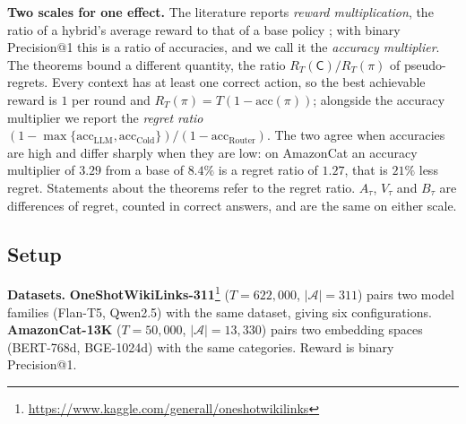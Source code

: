 \documentclass{article}
\theoremstyle{definition}
\theoremstyle{remark}
\theoremstyle{remark}
\newcommand{\Cold}{\mathsf{C}}
\begin{document}
\textbf{Two scales for one effect.} The literature reports \emph{reward
multiplication}, the ratio of a hybrid's average reward to that of a base
policy \cite{chen2024llmdecision}; with binary Precision@1 this is a ratio of
accuracies, and we call it the \emph{accuracy multiplier}. The theorems bound
a different quantity, the ratio $R_T(\Cold)/R_T(\pi)$ of pseudo-regrets. Every
context has at least one correct action, so the best achievable reward is $1$
per round and $R_T(\pi)=T(1-\mathrm{acc}(\pi))$; alongside the accuracy
multiplier we report the \emph{regret ratio}
$(1-\max\{\mathrm{acc}_{\mathrm{LLM}},\mathrm{acc}_{\mathrm{Cold}}\})/(1-\mathrm{acc}_{\mathrm{Router}})$.
The two agree when accuracies are high and differ sharply when they are low:
on AmazonCat an accuracy multiplier of $3.29$ from a base of $8.4\%$ is a
regret ratio of $1.27$, that is $21\%$ less regret. Statements about the
theorems refer to the regret ratio. $A_\tau$, $V_\tau$ and $B_\tau$ are
differences of regret, counted in correct answers, and are the same on either
scale.

\subsection{Setup}
\label{sec:exp-setup}

\textbf{Datasets.} \textbf{OneShotWikiLinks-311}\footnote{\url{https://www.kaggle.com/generall/oneshotwikilinks}} ($T\!=\!622{,}000$,
$|\mathcal A|\!=\!311$) pairs two model families (Flan-T5, Qwen2.5) with the
same dataset, giving six configurations. \textbf{AmazonCat-13K}
\cite{bhatia2016extreme} ($T\!=\!50{,}000$, $|\mathcal A|\!=\!13{,}330$) pairs two embedding spaces
(BERT-768d, BGE-1024d) with the same categories. Reward is binary
Precision@1.
\end{document}

